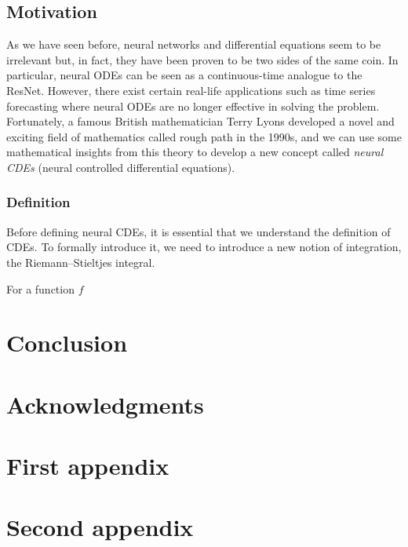 \documentclass[a4paper,11pt, titlepage]{article}
\theoremstyle{definition}
\theoremstyle{plain}
\theoremstyle{remark}
\begin{document}
\subsection{Motivation}
As we have seen before, neural networks and differential equations seem to be irrelevant but, in fact, they have been proven to be two sides of the same coin. In particular, neural ODEs can be seen as a continuous-time analogue to the ResNet. However, there exist certain real-life applications such as time series forecasting where neural ODEs are no longer effective in solving the problem. Fortunately, a famous British mathematician Terry Lyons developed a novel and exciting field of mathematics called rough path in the 1990s, and we can use some mathematical insights from this theory to develop a new concept called \textit{neural CDEs} (neural controlled differential equations).

\subsubsection{Definition}
Before defining neural CDEs, it is essential that we understand the definition of CDEs. To formally introduce it, we need to introduce a new notion of integration, the Riemann–Stieltjes integral.

For a function $f$

\section{Conclusion}

\section*{Acknowledgments}

\appendix

\section{First appendix}

\section{Second appendix}


\end{document}
